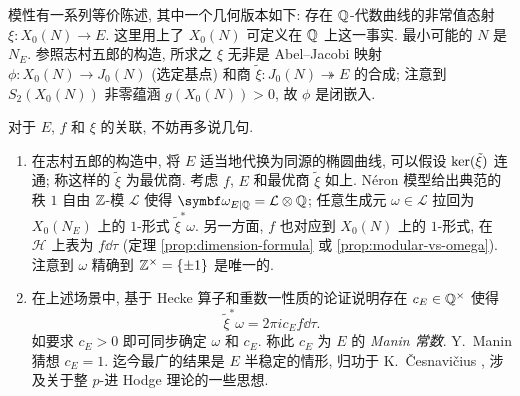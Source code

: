 
模性有一系列等价陈述, 其中一个几何版本如下: 存在 $\mathbb{Q}$-代数曲线的非常值态射 $\xi: X_0(N) \to E$. 这里用上了 $X_0(N)$ 可定义在 $\mathbb{Q}$ 上这一事实. 最小可能的 $N$ 是 $N_E$. 参照志村五郎的构造, 所求之 $\xi$ 无非是 Abel--Jacobi 映射 $\phi: X_0(N) \to J_0(N)$ (选定基点) 和商 $\tilde{\xi}: J_0(N) \twoheadrightarrow E$ 的合成; 注意到 $S_2(X_0(N))$ 非零蕴涵 $g(X_0(N)) > 0$, 故 $\phi$ 是闭嵌入.

对于 $E$, $f$ 和 $\xi$ 的关联, 不妨再多说几句.
\begin{enumerate}
	\item 在志村五郎的构造中, 将 $E$ 适当地代换为同源的椭圆曲线, 可以假设 $\operatorname{ker}(\tilde{\xi})$ 连通; 称这样的 $\tilde{\xi}$ 为最优商. 考虑 $f$, $E$ 和最优商 $\tilde{\xi}$ 如上. Néron 模型给出典范的秩 $1$ 自由 $\mathbb{Z}$-模 $\mathcal{L}$ 使得 $\bomega_{E|\Q} = \mathcal{L} \otimes \Q$; 任意生成元 $\omega \in \mathcal{L}$ 拉回为 $X_0(N_E)$ 上的 $1$-形式 $\tilde{\xi}^* \omega$. 另一方面, $f$ 也对应到 $X_0(N)$ 上的 $1$-形式, 在 $\mathcal{H}$ 上表为 $f \dd\tau$ (定理 \ref{prop:dimension-formula} 或 \ref{prop:modular-vs-omega}). 注意到 $\omega$ 精确到 $\mathbb{Z}^\times = \{\pm 1\}$ 是唯一的.

	\item 在上述场景中, 基于 Hecke 算子和重数一性质的论证说明存在 $c_E \in \mathbb{Q}^\times$ 使得
	\[ \tilde{\xi}^* \omega = 2\pi i c_E f \dd\tau. \]
	如要求 $c_E > 0$ 即可同步确定 $\omega$ 和 $c_E$. 称此 $c_E$ 为 $E$ 的 \emph{Manin 常数}. Y.\ Manin 猜想 $c_E = 1$. 迄今最广的结果是 $E$ 半稳定的情形, 归功于 K.\ Česnavičius \cite{Ces18}, 涉及关于整 $p$-进 Hodge 理论的一些思想.
\end{enumerate}

